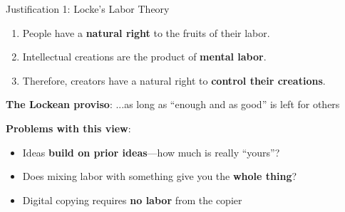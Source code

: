 ﻿\documentclass[aspectratio=169,11pt]{beamer}
\begin{document}
\begin{frame}{Justification 1: Locke's Labor Theory}
\begin{argumentbox}
\begin{enumerate}
    \item People have a \textbf{natural right} to the fruits of their labor.
    \item Intellectual creations are the product of \textbf{mental labor}.
    \item Therefore, creators have a natural right to \textbf{control their creations}.
\end{enumerate}
\end{argumentbox}

\vspace{0.3cm}
\textbf{The Lockean proviso}: ...as long as ``enough and as good'' is left for others

\vspace{0.3cm}
\textbf{Problems with this view}:
\begin{itemize}
    \item Ideas \textbf{build on prior ideas}---how much is really ``yours''?
    \item Does mixing labor with something give you the \textbf{whole thing}?
    \item Digital copying requires \textbf{no labor} from the copier
\end{itemize}
\end{frame}
\end{document}
